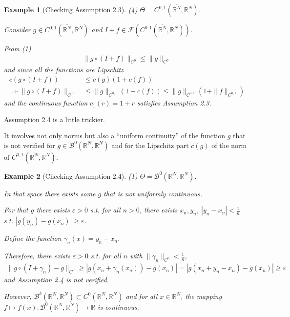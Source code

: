 \documentclass{book}
\numberwithin{equation}{section}
\newtheorem{example}{Example}[section]
\begin{document}
\begin{enumerate}
\begin{example}[Checking Assumption 2.3]
        (4) $\Theta = C^{0,1}(\overline{\mathbb{R}^N},\mathbb{R}^N)$.
        
        Consider $g\in C^{0,1}(\overline{\mathbb{R}^N},\mathbb{R}^N)$ and $I + f\in\mathcal{F}(C^{0,1}(\overline{\mathbb{R}^N},\mathbb{R}^N))$.
        
        From (1)
        \begin{align*}
            \|g\circ(I + f)\|_{C^0}\le\|g\|_{C^0}
        \end{align*}
        and since all the functions are Lipschitz
        \begin{align*}
            c\left(g\circ(I + f)\right)&\le c(g)(1 + c(f))\\
            \Rightarrow\|g\circ(I + f)\|_{C^{0,1}}&\le\|g\|_{C^{0,1}}(1 + c(f))\le\|g\|_{C^{0,1}}\left(1 + \|f\|_{C^{0,1}}\right)
        \end{align*}
        and the continuous function $c_1(r) = 1 + r$ satisfies Assumption 2.3.
    \end{example}
    Assumption 2.4 is a little trickier.
    
    It involves not only norms but also a ``uniform continuity'' of the function $g$ that is not verified for $g\in\mathcal{B}^0(\mathbb{R}^N,\mathbb{R}^N)$ and for the Lipschitz part $c(g)$ of the norm of $C^{0,1}(\overline{\mathbb{R}^N},\mathbb{R}^N)$.
    
    \begin{example}[Checking Assumption 2.4]
        (1) $\Theta = \mathcal{B}^0(\mathbb{R}^N,\mathbb{R}^N)$.
        
        In that space there exists some $g$ that is not uniformly continuous.
        
        For that $g$ there exists $\varepsilon > 0$ s.t. for all $n > 0$, there exists $x_n,y_n$, $|y_n - x_n| < \frac{1}{n}$ s.t. $|g(y_n) - g(x_n)|\ge\varepsilon$.
        
        Define the function $\gamma_n(x) = y_n - x_n$.
        
        Therefore, there exists $\varepsilon > 0$ s.t. for all $n$ with $\|\gamma_n\|_{C^0} < \frac{1}{n}$,
        \begin{align*}
            \|g\circ(I + \gamma_n) - g\|_{C^0}\ge|g(x_n + \gamma_n(x_n)) - g(x_n)| = |g(x_n + y_n - x_n) - g(x_n)|\ge\varepsilon
        \end{align*}
        and Assumption 2.4 is not verified.
        
        However, $\mathcal{B}^k(\mathbb{R}^N,\mathbb{R}^N)\subset C^0(\mathbb{R}^N,\mathbb{R}^N)$ and for all $x\in\mathbb{R}^N$, the mapping $f\mapsto f(x):\mathcal{B}^0(\mathbb{R}^N,\mathbb{R}^N)\to\mathbb{R}$ is continuous.
        

\end{example}
\end{enumerate}
\end{document}
